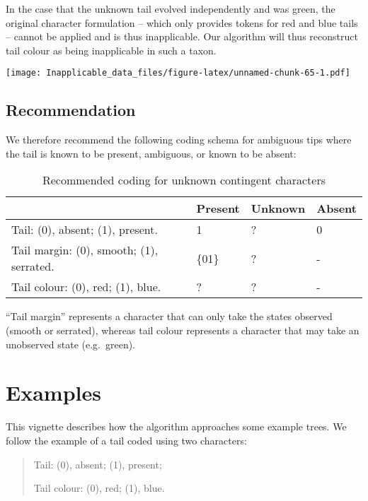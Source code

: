 \documentclass[]{book}
\theoremstyle{definition}
\theoremstyle{definition}
\theoremstyle{definition}
\theoremstyle{remark}
\begin{document}
In the case that the unknown tail evolved independently and was green,
the original character formulation -- which only provides tokens for red
and blue tails -- cannot be applied and is thus inapplicable. Our
algorithm will thus reconstruct tail colour as being inapplicable in
such a taxon.

\texttt{[image: Inapplicable\_data\_files/figure-latex/unnamed-chunk-65-1.pdf]}

\hypertarget{recommendation}{%
\section{Recommendation}\label{recommendation}}

We therefore recommend the following coding schema for ambiguous tips
where the tail is known to be present, ambiguous, or known to be absent:

\begin{table}

\caption{\label{tab:unnamed-chunk-66}Recommended coding for unknown contingent characters}
\centering
\begin{tabular}[t]{l|l|l|l}
\hline
  & Present & Unknown & Absent\\
\hline
Tail: (0), absent; (1), present. & 1 & ? & 0\\
\hline
Tail margin: (0), smooth; (1), serrated. & \{01\} & ? & -\\
\hline
Tail colour: (0), red; (1), blue. & ? & ? & -\\
\hline
\end{tabular}
\end{table}

``Tail margin'' represents a character that can only take the states
observed (smooth or serrated), whereas tail colour represents a
character that may take an unobserved state (e.g.~green).

\hypertarget{examples}{%
\chapter{Examples}\label{examples}}

This vignette describes how the algorithm approaches some example trees.
We follow the example of a tail coded using two characters:

\begin{quote}
Tail: (0), absent; (1), present;

Tail colour: (0), red; (1), blue.
\end{quote}
\end{document}
